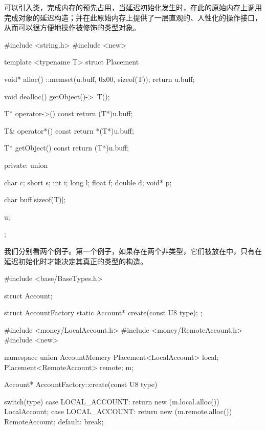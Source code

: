 \begin{content}
可以引入类，完成内存的预先占用，当延迟初始化发生时，在此的原始内存上调用完成对象的延迟构造；并在此原始内存上提供了一层直观的、人性化的操作接口，从而可以很方便地操作被修饰的类型对象。

\begin{leftbar}
\begin{c++}
#include <string.h>
#include <new>

template <typename T>
struct Placement
{
    void* alloc()
    {
        ::memset(u.buff, 0x00, sizeof(T));
        return u.buff;
    }

    void dealloc()
    {
        getObject()->~T();
    }    

    T* operator->() const
    {
        return (T*)u.buff;
    }

    T& operator*() const
    {
        return *(T*)u.buff;
    }

    T* getObject() const
    {
        return (T*)u.buff;
    }

private:
    union
    {
        char   c;
        short  s;
        int    i;
        long   l;
        float  f;
        double d;
        void*  p;

        char buff[sizeof(T)];
    }u;
};
\end{c++}
\end{leftbar}

我们分别看两个例子。第一个例子，如果存在两个非类型，它们被放在中，只有在延迟初始化时才能决定其真正的类型的构造。

\begin{leftbar}
\begin{c++}
#include <base/BaseTypes.h>

struct Account;

struct AccountFactory
{
    static Account* create(const U8 type);
};
\end{c++}    
\end{leftbar}

\begin{leftbar}
\begin{c++}
#include <money/LocalAccount.h>
#include <money/RemoteAccount.h>
#include <new>

namespace
{
    union AccountMemery
    {
        Placement<LocalAccount>  local;
        Placement<RemoteAccount> remote;
    } m;
}

Account* AccountFactory::create(const U8 type)
{
    switch(type)
    {
    case LOCAL_ACCOUNT: 
        return new (m.local.alloc()) LocalAccount;
    case LOCAL_ACCOUNT: 
        return new (m.remote.alloc()) RemoteAccount;
    default: break;
    }
    
}
\end{c++}
\end{leftbar}
\end{content}
